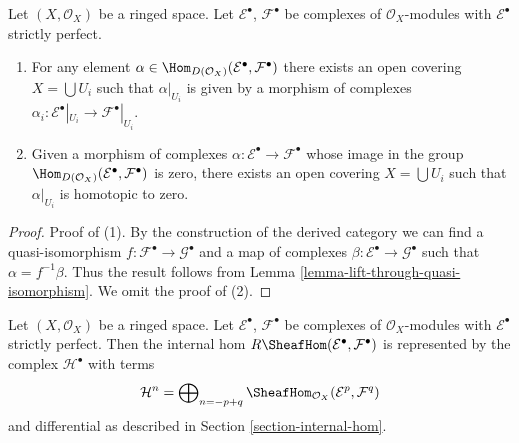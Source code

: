 \begin{lemma}
\label{lemma-local-actual}
Let $(X, \mathcal{O}_X)$ be a ringed space.
Let $\mathcal{E}^\bullet$, $\mathcal{F}^\bullet$ be complexes
of $\mathcal{O}_X$-modules with $\mathcal{E}^\bullet$ strictly perfect.
\begin{enumerate}
\item For any element
$\alpha \in \Hom_{D(\mathcal{O}_X)}(\mathcal{E}^\bullet, \mathcal{F}^\bullet)$
there exists an open covering $X = \bigcup U_i$ such that
$\alpha|_{U_i}$ is given by a morphism of complexes
$\alpha_i : \mathcal{E}^\bullet|_{U_i} \to \mathcal{F}^\bullet|_{U_i}$.
\item Given a morphism of complexes
$\alpha : \mathcal{E}^\bullet \to \mathcal{F}^\bullet$
whose image in the group
$\Hom_{D(\mathcal{O}_X)}(\mathcal{E}^\bullet, \mathcal{F}^\bullet)$
is zero, there exists an open covering $X = \bigcup U_i$ such that
$\alpha|_{U_i}$ is homotopic to zero.
\end{enumerate}
\end{lemma}

\begin{proof}
Proof of (1).
By the construction of the derived category we can find a quasi-isomorphism
$f : \mathcal{F}^\bullet \to \mathcal{G}^\bullet$ and a map of complexes
$\beta : \mathcal{E}^\bullet \to \mathcal{G}^\bullet$ such that
$\alpha = f^{-1}\beta$. Thus the result follows from
Lemma \ref{lemma-lift-through-quasi-isomorphism}.
We omit the proof of (2).
\end{proof}

\begin{lemma}
\label{lemma-Rhom-strictly-perfect}
Let $(X, \mathcal{O}_X)$ be a ringed space.
Let $\mathcal{E}^\bullet$, $\mathcal{F}^\bullet$ be complexes
of $\mathcal{O}_X$-modules with $\mathcal{E}^\bullet$ strictly perfect.
Then the internal hom $R\SheafHom(\mathcal{E}^\bullet, \mathcal{F}^\bullet)$
is represented by the complex $\mathcal{H}^\bullet$ with terms
$$
\mathcal{H}^n =
\bigoplus\nolimits_{n = - p + q}
\SheafHom_{\mathcal{O}_X}(\mathcal{E}^p, \mathcal{F}^q)
$$
and differential as described in Section \ref{section-internal-hom}.
\end{lemma}

